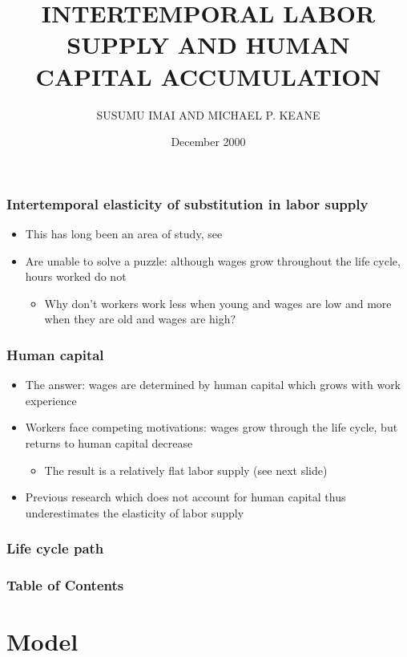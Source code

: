 \documentclass{beamer}
\title{INTERTEMPORAL LABOR SUPPLY AND HUMAN CAPITAL ACCUMULATION}
\author{SUSUMU IMAI AND MICHAEL P. KEANE}
\date{December 2000}
\begin{document}
\frame{\titlepage}


\begin{frame}
  \frametitle{Intertemporal elasticity of substitution in labor supply}
  \begin{itemize}
  \item This has long been an area of study, see \cite{Lucas1969-ti}
  \item Are unable to solve a puzzle: although wages grow throughout the life cycle, hours worked do not
    \begin{itemize}
    \item Why don't workers work less when young and wages are low and more when they are old and wages are high?
      \end{itemize}
  \end{itemize}
\end{frame}

\begin{frame}
  \frametitle{Human capital}
  \begin{itemize}
  \item The answer: wages are determined by human capital which grows with work experience
  \item Workers face competing motivations: wages grow through the life cycle, but returns to human capital decrease
        \begin{itemize}
        \item The result is a relatively flat labor supply (see next slide)
        \end{itemize}
  \item Previous research which does not account for human capital thus underestimates the elasticity of labor supply
  \end{itemize}
\end{frame}

\begin{frame}
 \frametitle{Life cycle path}

\end{frame}

\begin{frame}
  \frametitle{Table of Contents}
  \tableofcontents
\end{frame}
    
    \section{Model}
    \begin{frame}
      \frametitle{}
      \begin{figure}[H]
        \centering
      \end{figure}
  \end{frame}
\end{document}
